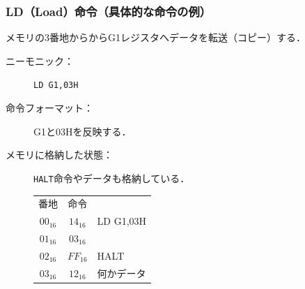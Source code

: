 \documentclass[handout]{beamer}        %
\begin{document}
\begin{frame}
  \frametitle{LD（Load）命令（具体的な命令の例）}
  メモリの3番地からからG1レジスタへデータを転送（コピー）する．

  \begin{description}
  \item[ニーモニック：] \texttt{LD G1,03H}

  \item[命令フォーマット：] G1と03Hを反映する．\\
    \vspace{1.0cm}

  \item[メモリに格納した状態：]\texttt{HALT}命令やデータも格納している．
    {\ttfamily\small\begin{center}
      \begin{tabular}{c|c|l}
        \multicolumn{1}{c}{番地} &
        \multicolumn{1}{c}{命令} &
        \multicolumn{1}{c}{}  \\
        \cline{2-2}
        $00_{16}$ & $14_{16}$ & LD G1,03H  \\
        \cline{2-2}
        $01_{16}$ & $03_{16}$ &            \\
        \cline{2-2}
        $02_{16}$ & $FF_{16}$ & HALT       \\
        \cline{2-2}
        $03_{16}$ & $12_{16}$ & 何かデータ \\
        \cline{2-2}
      \end{tabular}
    \end{center}}
  \end{description}
\end{frame}
\end{document}
